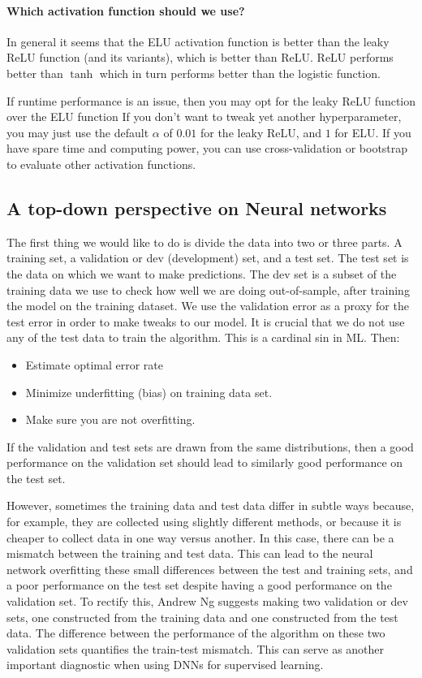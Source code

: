 \documentclass[%
oneside,                 %
final,                   %
10pt]{article}
\begin{document}
\paragraph{Which activation function should we use?}
In general it seems that the ELU activation function is better than
the leaky ReLU function (and its variants), which is better than
ReLU. ReLU performs better than $\tanh$ which in turn performs better
than the logistic function. 

If runtime
performance is an issue, then you may opt for the  leaky ReLU function  over the 
ELU function If you don’t
want to tweak yet another hyperparameter, you may just use the default
$\alpha$ of $0.01$ for the leaky ReLU, and $1$ for ELU. If you have
spare time and computing power, you can use cross-validation or
bootstrap to evaluate other activation functions.


\subsection{A top-down perspective on Neural networks}

The first thing we would like to do is divide the data into two or three
parts. A training set, a validation or dev (development) set, and a
test set. The test set is the data on which we want to make
predictions. The dev set is a subset of the training data we use to
check how well we are doing out-of-sample, after training the model on
the training dataset. We use the validation error as a proxy for the
test error in order to make tweaks to our model. It is crucial that we
do not use any of the test data to train the algorithm. This is a
cardinal sin in ML. Then:


\begin{itemize}
\item Estimate optimal error rate

\item Minimize underfitting (bias) on training data set.

\item Make sure you are not overfitting.
\end{itemize}

\noindent
If the validation and test sets are drawn from the same distributions,
then a good performance on the validation set should lead to similarly
good performance on the test set. 

However, sometimes
the training data and test data differ in subtle ways because, for
example, they are collected using slightly different methods, or
because it is cheaper to collect data in one way versus another. In
this case, there can be a mismatch between the training and test
data. This can lead to the neural network overfitting these small
differences between the test and training sets, and a poor performance
on the test set despite having a good performance on the validation
set. To rectify this, Andrew Ng suggests making two validation or dev
sets, one constructed from the training data and one constructed from
the test data. The difference between the performance of the algorithm
on these two validation sets quantifies the train-test mismatch. This
can serve as another important diagnostic when using DNNs for
supervised learning.
\end{document}
